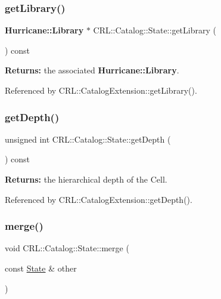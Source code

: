 \subsubsection{\texorpdfstring{get\+Library()}{getLibrary()}}
{\footnotesize\ttfamily \textbf{ Hurricane\+::\+Library} $\ast$ C\+R\+L\+::\+Catalog\+::\+State\+::get\+Library (\begin{DoxyParamCaption}{ }\end{DoxyParamCaption}) const\hspace{0.3cm}{\ttfamily [inline]}}

{\bfseries Returns\+:} the associated \textbf{ Hurricane\+::\+Library}. 

Referenced by C\+R\+L\+::\+Catalog\+Extension\+::get\+Library().

\mbox{\label{classCRL_1_1Catalog_1_1State_a0232ad6dcfda1e2801f788deaad83e08}} 
\subsubsection{\texorpdfstring{get\+Depth()}{getDepth()}}
{\footnotesize\ttfamily unsigned int C\+R\+L\+::\+Catalog\+::\+State\+::get\+Depth (\begin{DoxyParamCaption}{ }\end{DoxyParamCaption}) const\hspace{0.3cm}{\ttfamily [inline]}}

{\bfseries Returns\+:} the hierarchical depth of the Cell. 

Referenced by C\+R\+L\+::\+Catalog\+Extension\+::get\+Depth().

\mbox{\label{classCRL_1_1Catalog_1_1State_a41fde67f1b88de06cae113a0d8108f25}} 
\subsubsection{\texorpdfstring{merge()}{merge()}}
{\footnotesize\ttfamily void C\+R\+L\+::\+Catalog\+::\+State\+::merge (\begin{DoxyParamCaption}\item[{const \hyperlink{classCRL_1_1Catalog_1_1State}{State} \&}]{other }\end{DoxyParamCaption})\hspace{0.3cm}{\ttfamily [inline]}}

